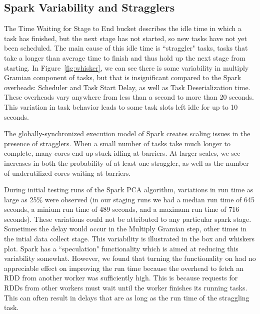 \subsection{Spark Variability and Stragglers}
The Time Waiting for Stage to End bucket describes the idle time in which a task has finished, but the next stage has not started, so new tasks have not yet been scheduled. The main cause of this idle time is ``straggler" tasks, tasks that take a longer than average time to finish and thus hold up the next stage from starting. In Figure~\ref{fig:whisker}, we can see there is some variability in multiply Gramian component of tasks, but that is insignificant compared to the Spark overheads: Scheduler and Task Start Delay, as well as Task Deserialization time. These overheads vary anywhere from less than a second to more than 20 seconds. This variation in task behavior leads to some task slots left idle for up to 10 seconds.

The globally-synchronized execution model of Spark creates scaling issues in the presence of stragglers. When a small number of tasks take much longer to complete, many cores end up stuck idling at barriers. At larger scales, we see increases in both the probability of at least one straggler, as well as the number of underutilized cores waiting at barriers.


During initial testing runs of the Spark PCA algorithm, variations in run time as large as 25\% were observed (in our staging runs we had a median run time of 645 seconds, a minium run time of 489 seconds, and a maximum run time of 716 seconds). These variations could not be attributed to any particular spark stage. Sometimes the delay would occur in the Multiply Gramian step, other times in the intial data collect stage. This variability is illustrated in the box and whiskers plot. Spark has a ``speculation" functionality which is aimed at reducing this variability somewhat. However, we found that turning the functionality on had no appreciable effect on improving the run time because the overhead to fetch an RDD from another worker was sufficiently high. This is because requests for RDDs from other workers must wait until the worker finishes its running tasks. This can often result in delays that are as long as the run time of the straggling task.  



